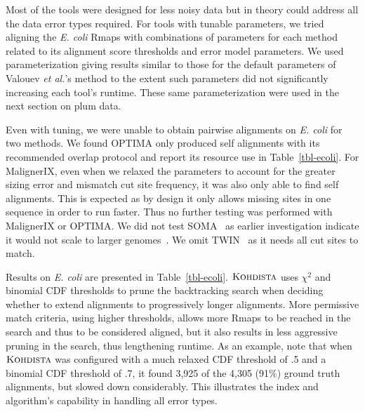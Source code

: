 Most of the tools were designed for less noisy data but in theory could address all the data error types required. For tools with tunable parameters, we tried aligning the {\it E. coli} Rmaps  with combinations of parameters for each method related to its alignment score thresholds and error model parameters.  We used parameterization giving results similar to those for the default parameters of Valouev {\it et al.}'s method to the extent such parameters did not significantly increasing each tool's runtime.  These same parameterization were used in the next section on plum data.

Even with tuning, we were unable to obtain pairwise alignments on {\it E. coli} for two methods. We found OPTIMA only produced self alignments with its recommended overlap protocol and report its resource use in Table~\ref{tbl-ecoli}.
For MalignerIX, even when we relaxed the parameters to account for the greater sizing error and mismatch cut site frequency, it was also only able to find self alignments.  This is expected as by design it only allows missing sites in one sequence in order to run faster. Thus no further testing was performed with MalignerIX or OPTIMA. We did not test SOMA~\cite{Nagarajan08} as earlier investigation indicate it would not scale to larger genomes~\cite{wabi2014}. We omit TWIN~\cite{wabi2014} as it needs all cut sites to match.

Results on {\it E. coli} are presented in Table~\ref{tbl-ecoli}. $\mbox{\rm \textsc{Kohdista}}$ uses $\chi^2$ and binomial CDF thresholds to prune the backtracking search when deciding whether to extend alignments to progressively longer alignments.  More permissive match criteria, using higher thresholds, allows  more Rmaps to be reached in the search and thus to be considered aligned, but it also results in less aggressive pruning in the search, thus lengthening runtime.  As an example, note that when $\mbox{\rm \textsc{Kohdista}}$ was configured with a much relaxed CDF threshold of .5 and a binomial CDF threshold of .7, it found 3,925 of the 4,305 (91\%) ground truth alignments, but slowed down considerably.  This illustrates the index and algorithm's capability in handling all error types.


